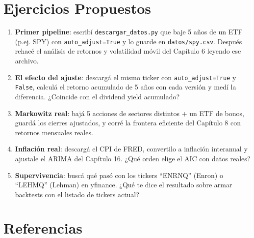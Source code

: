\documentclass[
  spanish,
  letterpaper,
  DIV=11,
  numbers=noendperiod]{scrreprt}
\providecommand{\tightlist}{%
  \setlength{\itemsep}{0pt}\setlength{\parskip}{0pt}}
\begin{document}
\section{Ejercicios Propuestos}\label{ejercicios-propuestos-20}

\begin{tcolorbox}[enhanced jigsaw, bottomrule=.15mm, colback=white, opacitybacktitle=0.6, arc=.35mm, toprule=.15mm, opacityback=0, breakable, titlerule=0mm, left=2mm, coltitle=black, colbacktitle=quarto-callout-important-color!10!white, colframe=quarto-callout-important-color-frame, leftrule=.75mm, toptitle=1mm, bottomtitle=1mm, title=\textcolor{quarto-callout-important-color}{\faExclamation}\hspace{0.5em}{Ejercicios}, rightrule=.15mm]

\begin{enumerate}
\def\labelenumi{\arabic{enumi}.}
\tightlist
\item
  \textbf{Primer pipeline}: escribí \texttt{descargar\_datos.py} que
  baje 5 años de un ETF (p.ej. SPY) con \texttt{auto\_adjust=True} y lo
  guarde en \texttt{datos/spy.csv}. Después rehacé el análisis de
  retornos y volatilidad móvil del Capítulo 6 leyendo ese archivo.
\item
  \textbf{El efecto del ajuste}: descargá el mismo ticker con
  \texttt{auto\_adjust=True} y \texttt{False}, calculá el retorno
  acumulado de 5 años con cada versión y medí la diferencia. ¿Coincide
  con el dividend yield acumulado?
\item
  \textbf{Markowitz real}: bajá 5 acciones de sectores distintos + un
  ETF de bonos, guardá los cierres ajustados, y corré la frontera
  eficiente del Capítulo 8 con retornos mensuales reales.
\item
  \textbf{Inflación real}: descargá el CPI de FRED, convertilo a
  inflación interanual y ajustale el ARIMA del Capítulo 16. ¿Qué orden
  elige el AIC con datos reales?
\item
  \textbf{Supervivencia}: buscá qué pasó con los tickers ``ENRNQ''
  (Enron) o ``LEHMQ'' (Lehman) en yfinance. ¿Qué te dice el resultado
  sobre armar backtests con el listado de tickers actual?
\end{enumerate}

\end{tcolorbox}

\section{Referencias}\label{referencias-20}

\label{refs}
\end{document}
